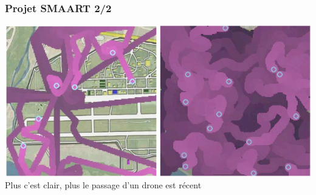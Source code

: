 \documentclass{beamer}
\begin{document}
\begin{frame}
  \frametitle{Projet SMAART 2/2}
  \begin{center}
    \includegraphics[width=\textwidth]{../Images/essaim.png}\\
    Plus c'est clair, plus le passage d'un drone est récent
  \end{center}
\end{frame}
\end{document}
